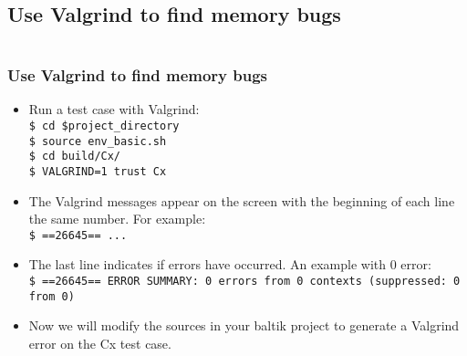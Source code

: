 \documentclass[10pt, hyperref={unicode=true,pdfusetitle, bookmarks=true,bookmarksnumbered=false,bookmarksopen=false, breaklinks=false,pdfborder={0 0 1},backref=true,colorlinks=true,linkcolor=darkblue,pageanchor, urlcolor=darkblue}]{beamer}
\begin{document}
\subsection{{\bf{Use Valgrind to find memory bugs}}}
\begin{frame}
\begin{columns}[c] 
\tableofcontents[sections={1-4},currentsection, currentsubsection]
\tableofcontents[sections={5-8},currentsection, currentsubsection]
\end{columns}
\end{frame}
\begin{frame}
\frametitle{Use Valgrind to find memory bugs}
\begin{block}{}

\begin{itemize}
\item Run a test case with Valgrind:\\
\texttt{\$ cd \$project\_directory}\\
\texttt{\$ source env\_basic.sh}\\
\texttt{\$ cd build/Cx/}\\
\texttt{\$ VALGRIND=1 trust Cx}\\
\item The Valgrind messages appear on the screen with the beginning of each line the same number. For example:\\
\texttt{\$ ==26645== ...}\\
\item The last line indicates if errors have occurred. An example with 0 error:\\
\texttt{\$ ==26645== ERROR SUMMARY: 0 errors from 0 contexts (suppressed: 0 from 0)}
\end{itemize}
\begin{itemize}
\item Now we will modify the sources in your baltik project to generate a Valgrind error on the Cx test case.\\
\end{itemize}

\end{block}
\end{frame}
\end{document}
